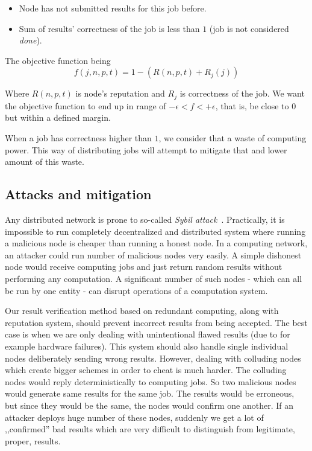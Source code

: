 \begin{itemize}
	\item Node has not submitted results for this job before.
    \item Sum of results' correctness of the job is less than $1$ (job is not considered \emph{done}).
\end{itemize}

The objective function being
\begin{equation}
f(j, n, p, t) = 1 - ( R(n, p, t) + R_j(j) )
\end{equation}

Where $R(n, p, t)$ is node's reputation and $R_j$ is correctness of the job. We want the objective function to end up in range of $- \epsilon < f < + \epsilon$, that is, be close to $0$ but within a defined margin.

When a job has correctness higher than $1$, we consider that a waste of computing power. This way of distributing jobs will attempt to mitigate that and lower amount of this waste.

\subsection{Attacks and mitigation}

Any distributed network is prone to so-called \emph{Sybil attack}~\cite{douceur2002sybil}. Practically, it is impossible to run completely decentralized and distributed system where running a malicious node is cheaper than running a honest node. In a computing network, an attacker could run number of malicious nodes very easily. A simple dishonest node would receive computing jobs and just return random results without performing any computation. A significant number of such nodes - which can all be run by one entity - can disrupt operations of a computation system.

Our result verification method based on redundant computing, along with reputation system, should prevent incorrect results from being accepted. The best case is when we are only dealing with unintentional flawed results (due to for example hardware failures). This system should also handle single individual nodes deliberately sending wrong results. However, dealing with colluding nodes which create bigger schemes in order to cheat is much harder. The colluding nodes would reply deterministically to computing jobs. So two malicious nodes would generate same results for the same job. The results would be erroneous, but since they would be the same, the nodes would confirm one another. If an attacker deploys huge number of these nodes, suddenly we get a lot of ,,confirmed'' bad results which are very difficult to distinguish from legitimate, proper, results.

